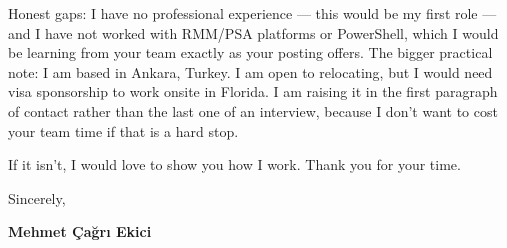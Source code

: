 \documentclass[11pt,a4paper]{article}
\begin{document}
Honest gaps: I have no professional experience --- this would be my first role --- and I have not worked with RMM/PSA platforms or PowerShell, which I would be learning from your team exactly as your posting offers. The bigger practical note: I am based in Ankara, Turkey. I am open to relocating, but I would need visa sponsorship to work onsite in Florida. I am raising it in the first paragraph of contact rather than the last one of an interview, because I don't want to cost your team time if that is a hard stop.

If it isn't, I would love to show you how I work. Thank you for your time.

Sincerely,

\textbf{Mehmet Çağrı Ekici}
\end{document}
